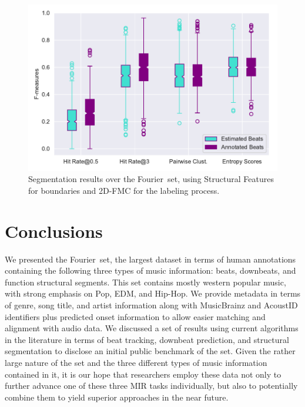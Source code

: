 \documentclass{article}
\newcommand{\setName}{Fourier}
\begin{document}
\begin{figure}
    \centerline{\includegraphics[width=1.1\columnwidth]{figs/segment_results.pdf}}
    \caption{Segmentation results over the \setName~set, using Structural Features for boundaries and 2D-FMC for the labeling process.}
    \label{fig:segment_results}
\end{figure}

\section{Conclusions}\label{sec:conclusions}

We presented the \setName~set, the largest dataset in terms of human annotations containing the following three types of music information: beats, downbeats, and function structural segments.
This set contains mostly western popular music, with strong emphasis on Pop, EDM, and Hip-Hop.
We provide metadata in terms of genre, song title, and artist information along with MusicBrainz and AcoustID identifiers plus predicted onset information to allow easier matching and alignment with audio data.
We discussed a set of results using current algorithms in the literature in terms of beat tracking, downbeat prediction, and structural segmentation to disclose an initial public benchmark of the set.
Given the rather large nature of the set and the three different types of music information contained in it, it is our hope that researchers employ these data not only to further advance one of these three MIR tasks individually, but also to potentially combine them to yield superior approaches in the near future.


\end{document}
